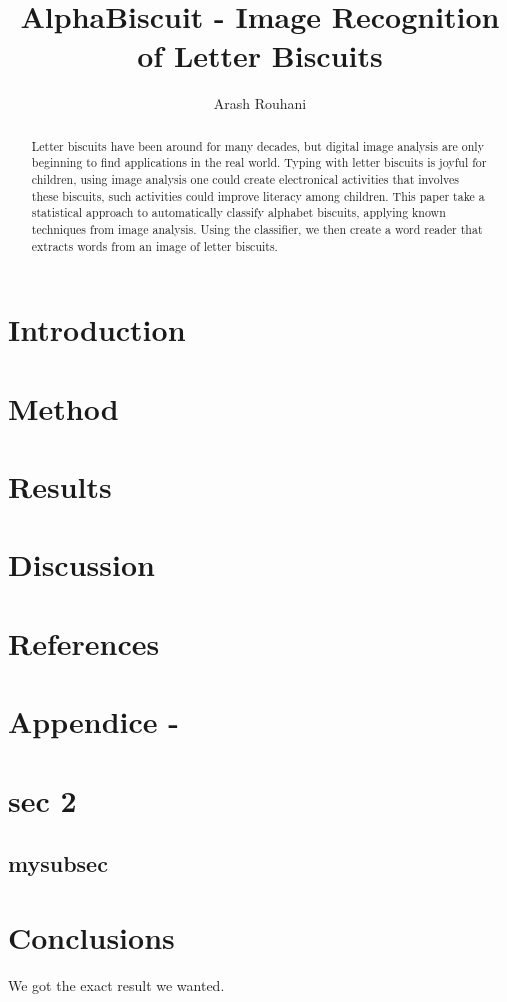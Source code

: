 \documentclass[a4paper,11pt]{article}
\title{AlphaBiscuit - Image Recognition of Letter Biscuits}
\author{Arash Rouhani}
\begin{document}
\maketitle

\begin{abstract}
Letter biscuits have been around for many decades, but digital
image analysis are only beginning to find applications in the real world.
Typing with letter biscuits is joyful for children, using image analysis
one could create electronical activities that involves these biscuits,
such activities could improve literacy among children.
This paper take a statistical approach to automatically classify
alphabet biscuits, applying known techniques from image analysis.
Using the classifier, we then create a word reader that
extracts words from an image of letter biscuits.


\end{abstract}

\section{Introduction}
\section{Method}
\section{Results}
\section{Discussion}
\section{References}
\section{Appendice -}
\section{sec 2}

\subsection{mysubsec}
\section{Conclusions}
We got the exact result we wanted.
\end{document}
